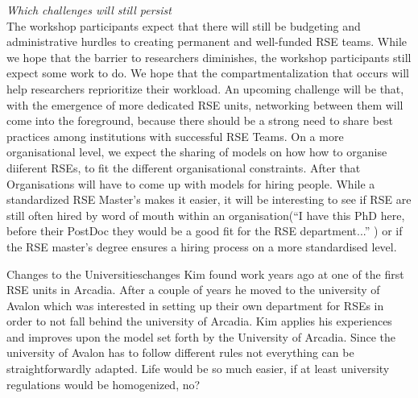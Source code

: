 \documentclass{eceasst}
\begin{document}
\emph{Which challenges will still persist}\\
The workshop participants expect that there will still be budgeting and administrative hurdles to creating
permanent and well-funded RSE teams.
While we hope that the barrier to researchers diminishes, the workshop participants
still expect some work to do. We hope that the compartmentalization that occurs will help researchers reprioritize their workload.
An upcoming challenge will be that, with the emergence of more dedicated RSE units,
networking between them will come into the foreground, because there should be a strong need to share best practices
among institutions with successful RSE Teams.
On a more organisational level, we expect the sharing of models on how how to organise diiferent RSEs, to fit the different organisational constraints.
After that Organisations will have to come up with models for hiring people.
While a standardized RSE Master's makes it easier, it will be interesting to see if
RSE are still often hired by word of mouth within an organisation(``I have this PhD here, before their PostDoc they would be a good fit for the RSE department...'' ) or if the RSE master's degree ensures a hiring process on a more standardised level.

\begin{story}{Changes to the Universities}{changes}
Kim found work years ago at one of the first RSE units in Arcadia. After a couple of years he moved to the university of
Avalon which was interested in setting up their own department for RSEs in order to not fall behind the university of Arcadia.
Kim applies his experiences and improves upon the model set forth by the University of Arcadia. Since the university
of Avalon has to follow different rules not everything can be straightforwardly adapted. Life would be so much easier,
if at least university regulations would be homogenized, no?
\end{story}
\end{document}
